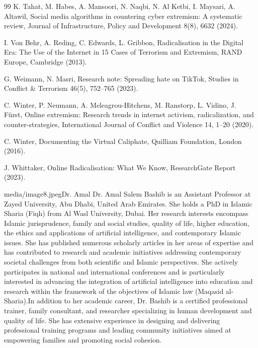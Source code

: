 \documentclass[10pt]{NSP1}
\begin{document}
\begin{thebibliography}{99}
K. Tahat, M. Habes, A. Mansoori, N. Naqbi, N. Al Ketbi, I. Maysari, A. Altawil, Social media algorithms in countering cyber extremism: A systematic review, Journal of Infrastructure, Policy and Development 8(8), 6632 (2024).

I. Von Behr, A. Reding, C. Edwards, L. Gribbon, Radicalisation in the Digital Era: The Use of the Internet in 15 Cases of Terrorism and Extremism, RAND Europe, Cambridge (2013).

G. Weimann, N. Masri, Research note: Spreading hate on TikTok, Studies in Conflict \& Terrorism 46(5), 752–765 (2023).

C. Winter, P. Neumann, A. Meleagrou-Hitchens, M. Ranstorp, L. Vidino, J. Fürst, Online extremism: Research trends in internet activism, radicalization, and counter-strategies, International Journal of Conflict and Violence 14, 1–20 (2020).

C. Winter, Documenting the Virtual Caliphate, Quilliam Foundation, London (2016).

J. Whittaker, Online Radicalisation: What We Know, ResearchGate Report (2023).

\end{thebibliography}




\begin{biographyps}{media/image8.jpeg}{Dr. Amal}
Dr. Amal Salem Bashib is an Assistant Professor at Zayed University, Abu Dhabi, United Arab Emirates. She holds a PhD in Islamic Sharia (Fiqh) from Al Wasl University, Dubai. Her research interests encompass Islamic jurisprudence, family and social studies, quality of life, higher education, the ethics and applications of artificial intelligence, and contemporary Islamic issues. She has published numerous scholarly articles in her areas of expertise and has contributed to research and academic initiatives addressing contemporary societal challenges from both scientific and Islamic perspectives. She actively participates in national and international conferences and is particularly interested in advancing the integration of artificial intelligence into education and research within the framework of the objectives of Islamic law (Maqasid al-Sharia).In addition to her academic career, Dr. Bashib is a certified professional trainer, family consultant, and researcher specializing in human development and quality of life. She has extensive experience in designing and delivering professional training programs and leading community initiatives aimed at empowering families and promoting social cohesion.\end{biographyps}
\end{document}

